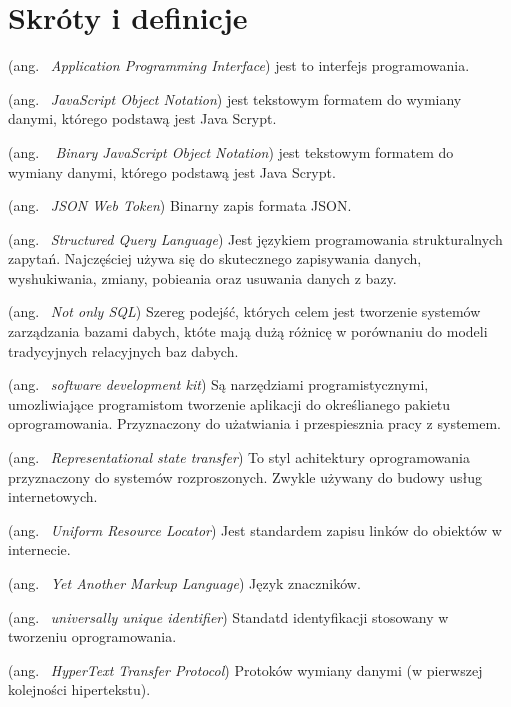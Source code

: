 \chapter*{Skróty i definicje}\mbox{}
\label{sec:skroty}
\noindent
\begin{description}[labelwidth=*]
  \item [API] (ang. \ \emph{Application Programming Interface}) jest to interfejs programowania.
  \item [JSON] (ang. \ \emph{JavaScript Object Notation}) jest tekstowym formatem do wymiany danymi, którego podstawą jest Java Scrypt.
  \item [BSON] (ang. \ \emph{ Binary JavaScript Object Notation}) jest tekstowym formatem do wymiany danymi, którego podstawą jest Java Scrypt.
  \item [JWT] (ang. \ \emph{JSON Web Token}) Binarny zapis formata JSON.
  \item [SQL] (ang. \ \emph{Structured Query Language}) Jest językiem programowania strukturalnych zapytań. Najczęściej używa się do skutecznego zapisywania danych, wyshukiwania, zmiany, pobieania oraz usuwania danych z bazy. 
  \item [NoSQL] (ang. \ \emph{Not only SQL}) Szereg podejść, których celem jest tworzenie systemów zarządzania bazami dabych, któte mają dużą różnicę w porównaniu do modeli tradycyjnych relacyjnych baz dabych.
  \item [SDK] (ang. \ \emph{software development kit}) Są narzędziami programistycznymi, umozliwiające programistom tworzenie aplikacji do określianego pakietu oprogramowania. Przyznaczony do użatwiania i przespiesznia pracy z systemem.
  \item [Rest] (ang. \ \emph{Representational state transfer}) To styl achitektury oprogramowania przyznaczony do systemów rozproszonych. Zwykle używany do budowy usług internetowych.
  \item [URL] (ang. \ \emph{Uniform Resource Locator}) Jest standardem zapisu linków do obiektów w internecie.
  \item [YAML] (ang. \ \emph{Yet Another Markup Language}) Język znaczników.
  \item [UUID] (ang. \ \emph{universally unique identifier}) Standatd identyfikacji stosowany w tworzeniu oprogramowania.
  \item [HTTP] (ang. \ \emph{HyperText Transfer Protocol}) Protoków wymiany danymi (w pierwszej kolejności hipertekstu).
\end{description}